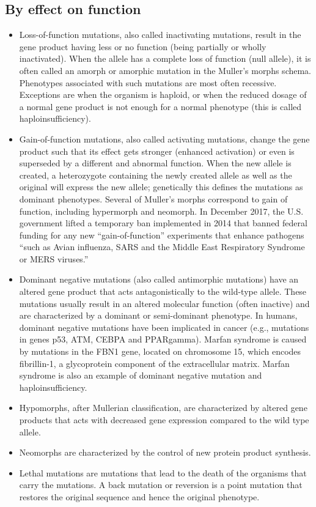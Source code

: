 \hypertarget{by-effect-on-function}{%
\subsection{By effect on function}\label{by-effect-on-function}}

\begin{itemize}
\tightlist
\item
  Loss-of-function mutations, also called inactivating mutations, result in the gene product having less or no function (being partially or wholly inactivated). When the allele has a complete loss of function (null allele), it is often called an amorph or amorphic mutation in the Muller's morphs schema. Phenotypes associated with such mutations are most often recessive. Exceptions are when the organism is haploid, or when the reduced dosage of a normal gene product is not enough for a normal phenotype (this is called haploinsufficiency).
\item
  Gain-of-function mutations, also called activating mutations, change the gene product such that its effect gets stronger (enhanced activation) or even is superseded by a different and abnormal function. When the new allele is created, a heterozygote containing the newly created allele as well as the original will express the new allele; genetically this defines the mutations as dominant phenotypes. Several of Muller's morphs correspond to gain of function, including hypermorph and neomorph. In December 2017, the U.S. government lifted a temporary ban implemented in 2014 that banned federal funding for any new ``gain-of-function'' experiments that enhance pathogens ``such as Avian influenza, SARS and the Middle East Respiratory Syndrome or MERS viruses.''
\item
  Dominant negative mutations (also called antimorphic mutations) have an altered gene product that acts antagonistically to the wild-type allele. These mutations usually result in an altered molecular function (often inactive) and are characterized by a dominant or semi-dominant phenotype. In humans, dominant negative mutations have been implicated in cancer (e.g., mutations in genes p53, ATM, CEBPA and PPARgamma). Marfan syndrome is caused by mutations in the FBN1 gene, located on chromosome 15, which encodes fibrillin-1, a glycoprotein component of the extracellular matrix. Marfan syndrome is also an example of dominant negative mutation and haploinsufficiency.
\item
  Hypomorphs, after Mullerian classification, are characterized by altered gene products that acts with decreased gene expression compared to the wild type allele.
\item
  Neomorphs are characterized by the control of new protein product synthesis.
\item
  Lethal mutations are mutations that lead to the death of the organisms that carry the mutations.
  A back mutation or reversion is a point mutation that restores the original sequence and hence the original phenotype.
\end{itemize}

